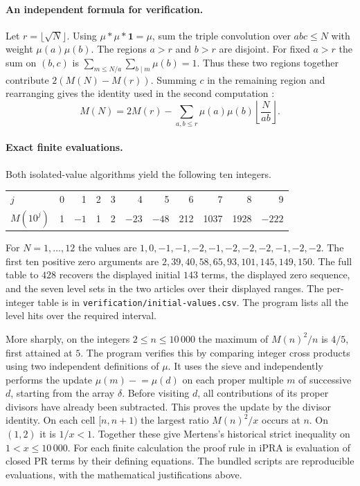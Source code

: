 \paragraph{An independent formula for verification.}
Let $r=\lfloor\sqrt N\rfloor$. Using $\mu*\mu*\mathbf1=\mu$, sum the triple convolution over $abc\le N$ with weight $\mu(a)\mu(b)$. The regions $a>r$ and $b>r$ are disjoint. For fixed $a>r$ the sum on $(b,c)$ is $\sum_{m\le N/a}\sum_{b\mid m}\mu(b)=1$. Thus these two regions together contribute $2(M(N)-M(r))$. Summing $c$ in the remaining region and rearranging gives the identity used in the second computation \cite{ht}:
\[
 M(N)=2M(r)-\sum_{a,b\le r}\mu(a)\mu(b)\left\lfloor\frac{N}{ab}\right\rfloor.
\]

\paragraph{Exact finite evaluations.}
Both isolated-value algorithms yield the following ten integers.
\begin{center}
\begin{tabular}{@{}lrrrrrrrrrr@{}}
\toprule
$j$&0&1&2&3&4&5&6&7&8&9\\
$M(10^j)$&1&$-1$&1&2&$-23$&$-48$&212&1037&1928&$-222$\\
\bottomrule
\end{tabular}
\end{center}
For $N=1,\ldots,12$ the values are
$1,0,-1,-1,-2,-1,-2,-2,-2,-1,-2,-2$. The first ten positive zero arguments are
$2,39,40,58,65,93,101,145,149,150$. The full table to $428$ recovers the displayed initial $143$ terms, the displayed zero sequence, and the seven level sets in the two articles over their displayed ranges. The per-integer table is in \texttt{verification/initial-values.csv}. The program lists all the level hits over the required interval.

More sharply, on the integers $2\le n\le10\,000$ the maximum of $M(n)^2/n$ is $4/5$, first attained at $5$. The program verifies this by comparing integer cross products using two independent definitions of $\mu$. It uses the sieve and independently performs the update $\mu(m)\mathrel{-}=\mu(d)$ on each proper multiple $m$ of successive $d$, starting from the array $\delta$. Before visiting $d$, all contributions of its proper divisors have already been subtracted. This proves the update by the divisor identity. On each cell $[n,n+1)$ the largest ratio $M(n)^2/x$ occurs at $n$. On $(1,2)$ it is $1/x<1$. Together these give Mertens's historical strict inequality on $1<x\le10\,000$. For each finite calculation the proof rule in iPRA is evaluation of closed PR terms by their defining equations. The bundled scripts are reproducible evaluations, with the mathematical justifications above.

